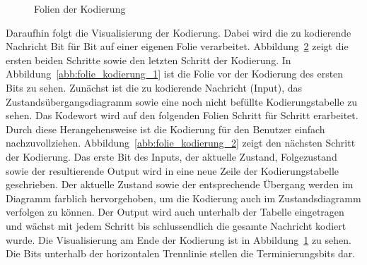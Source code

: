 \begin{figure}[t]
	\begin{subfigure}{0.65\textwidth}
		\centering
		\caption{}
		\label{abb:folie_kodierung_3}
	\end{subfigure}
	\caption{Folien der Kodierung}
	\label{abb:folie_kodierung}
\end{figure}
Daraufhin folgt die Visualisierung der Kodierung. Dabei wird die zu kodierende Nachricht Bit für Bit auf einer eigenen Folie verarbeitet. Abbildung~\ref{abb:folie_kodierung} zeigt die ersten beiden Schritte sowie den letzten Schritt der Kodierung. In Abbildung~\ref{abb:folie_kodierung_1} ist die Folie vor der Kodierung des ersten Bits zu sehen. Zunächst ist die zu kodierende Nachricht (Input), das Zustandsübergangsdiagramm sowie eine noch nicht befüllte Kodierungstabelle zu sehen. Das Kodewort wird auf den folgenden Folien Schritt für Schritt erarbeitet. Durch diese Herangehensweise ist die Kodierung für den Benutzer einfach nachzuvollziehen. Abbildung~\ref{abb:folie_kodierung_2} zeigt den nächsten Schritt der Kodierung. Das erste Bit des Inputs, der aktuelle Zustand, Folgezustand sowie der resultierende Output wird in eine neue Zeile der Kodierungstabelle geschrieben. Der aktuelle Zustand sowie der entsprechende Übergang werden im Diagramm farblich hervorgehoben, um die Kodierung auch im Zustandsdiagramm verfolgen zu können. Der Output wird auch unterhalb der Tabelle eingetragen und wächst mit jedem Schritt bis schlussendlich die gesamte Nachricht kodiert wurde. Die Visualisierung am Ende der Kodierung ist in Abbildung~\ref{abb:folie_kodierung_3} zu sehen. Die Bits unterhalb der horizontalen Trennlinie stellen die Terminierungsbits dar.
